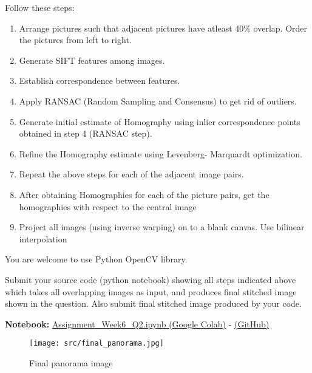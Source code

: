 \documentclass[12pt,a4paper]{article}
\begin{document}
Follow these steps:
\begin{enumerate}
    \item Arrange pictures such that adjacent pictures have atleast 40\% overlap. Order the pictures from left to right.
    \item Generate SIFT features among images.
    \item Establish correspondence between features.
    \item Apply RANSAC (Random Sampling and Consensus) to get rid of outliers.
    \item Generate initial estimate of Homography using inlier correspondence points obtained in step 4 (RANSAC step).
    \item Refine the Homography estimate using Levenberg- Marquardt optimization.
    \item Repeat the above steps for each of the adjacent image pairs.
    \item After obtaining Homographies for each of the picture pairs, get the homographies with respect to the central image
    \item Project all images (using inverse warping) on to a blank canvas. Use bilinear interpolation
\end{enumerate}

You are welcome to use Python OpenCV library.

Submit your source code (python notebook) showing all steps indicated above which takes all overlapping images as input, 
and produces final stitched image shown in the question. Also submit final stitched image produced by your code.

\textbf{Notebook:} \href{https://colab.research.google.com/drive/1eCEGWNIpp4dDtilvpM9eyMrYHPYjlth4?usp=sharing}{Assignment\_Week6\_Q2.ipynb (Google Colab)} - 
\href{https://github.com/bkhanal-11/ties411_cvip_jyu/blob/master/assignment6/src/Assignment_Week6_Q2.ipynb}{(GitHub)}

\begin{figure}[h]
    \centering
    \texttt{[image: src/final\_panorama.jpg]}
    \caption{Final panorama image}
    \label{fig:final_panorama}
\end{figure}
\end{document}
